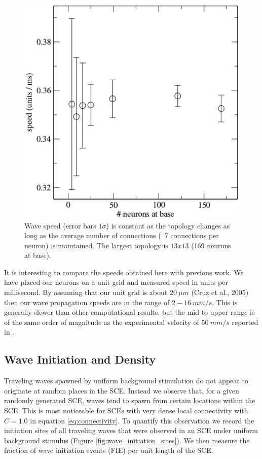 \documentclass[12pt]{article}
\begin{document}
\begin{figure}[!htb]
 \caption{ Wave speed (error bars $1\sigma$) is constant as the topology changes as long as the average number of connections (~7 connections per neuron) is maintained. The largest topology is $13x13$ (169 neurons at base).}
 \label{fig:delay_topology_avgconn}
 \centering
   \includegraphics[width=\textwidth]{fig/speed_vs_thick_m}
\end{figure}

\FloatBarrier

It is interesting to compare the speeds obtained here with previous work.
We have placed our neurons on a unit grid and measured speed in units per millisecond.
By assuming that our unit grid is about $20~\mu m$ (Cruz et al., 2005) then our wave propagation speeds are in the range of $2-16~mm/s$.
This is generally slower than other computational results, but the mid to upper range is of the same order of magnitude as the experimental velocity of $50~mm/s$ reported in \parencite{Golomb1997}.

\FloatBarrier


\subsection{Wave Initiation and Density} \label{sub:wave_initiation}
Traveling waves spawned by uniform background stimulation do not appear to originate at random places in the SCE.
Instead we observe that, for a given randomly generated SCE, waves tend to spawn from certain locations within the SCE.
This is most noticeable for SCEs with very dense local connectivity with $C=1.0$ in equation \ref{eq:connectivity}.
To quantify this observation we record the initiation sites of all traveling waves that were observed in an SCE under uniform background stimulus (Figure \ref{fig:wave_initiation_sites}).
We then measure the fraction of wave initiation events (FIE) per unit length of the SCE.
\end{document}
